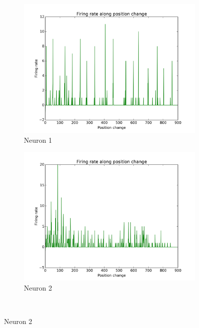\documentclass[11pt,a4paper,twocolumn]{article}
\begin{document}
\begin{figure}[htbp]
  \begin{subfigure}{.49\linewidth}\centering
    \includegraphics[width=1.1\textwidth]{figure2.png}
    \caption{Neuron 1\label{fig:FiringPosition_N1}}
  \end{subfigure}
  \begin{subfigure}{.49\linewidth}\centering
    \includegraphics[width=1.1\textwidth]{figure3.png}
    \caption{Neuron 2\label{fig:FiringPosition_N2}}
  \end{subfigure}\\[1ex]


\end{figure}
\end{document}
